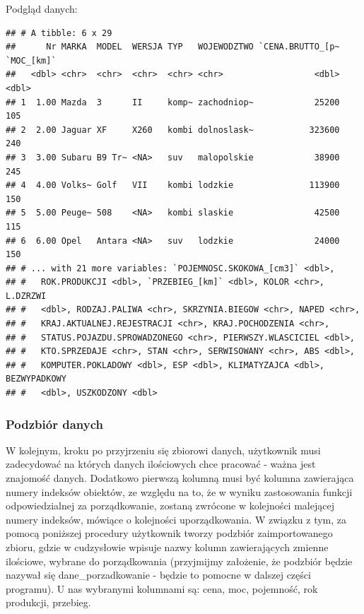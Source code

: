 \documentclass[12pt,a4paper]{report}
\begin{document}
{Podgląd danych:

\begin{Shaded}
\begin{Highlighting}[]
\end{Highlighting}
\end{Shaded}

\begin{verbatim}
## # A tibble: 6 x 29
##      Nr MARKA  MODEL  WERSJA TYP   WOJEWODZTWO `CENA.BRUTTO_[p~ `MOC_[km]`
##   <dbl> <chr>  <chr>  <chr>  <chr> <chr>                  <dbl>      <dbl>
## 1  1.00 Mazda  3      II     komp~ zachodniop~            25200        105
## 2  2.00 Jaguar XF     X260   kombi dolnoslask~           323600        240
## 3  3.00 Subaru B9 Tr~ <NA>   suv   malopolskie            38900        245
## 4  4.00 Volks~ Golf   VII    kombi lodzkie               113900        150
## 5  5.00 Peuge~ 508    <NA>   kombi slaskie                42500        115
## 6  6.00 Opel   Antara <NA>   suv   lodzkie                24000        150
## # ... with 21 more variables: `POJEMNOSC.SKOKOWA_[cm3]` <dbl>,
## #   ROK.PRODUKCJI <dbl>, `PRZEBIEG_[km]` <dbl>, KOLOR <chr>, L.DZRZWI
## #   <dbl>, RODZAJ.PALIWA <chr>, SKRZYNIA.BIEGOW <chr>, NAPED <chr>,
## #   KRAJ.AKTUALNEJ.REJESTRACJI <chr>, KRAJ.POCHODZENIA <chr>,
## #   STATUS.POJAZDU.SPROWADZONEGO <chr>, PIERWSZY.WLASCICIEL <dbl>,
## #   KTO.SPRZEDAJE <chr>, STAN <chr>, SERWISOWANY <chr>, ABS <dbl>,
## #   KOMPUTER.POKLADOWY <dbl>, ESP <dbl>, KLIMATYZAJCA <dbl>, BEZWYPADKOWY
## #   <dbl>, USZKODZONY <dbl>
\end{verbatim}

\subsubsection{Podzbiór danych}\label{podzbior-danych}

W kolejnym, kroku po przyjrzeniu się zbiorowi danych, użytkownik musi
zadecydować na których danych ilościowych chce pracować - ważna jest
znajomość danych. Dodatkowo pierwszą kolumną musi być kolumna
zawierająca numery indeksów obiektów, ze względu na to, że w wyniku
zastosowania funkcji odpowiedzialnej za porządkowanie, zostaną zwrócone
w kolejności malejącej numery indeksów, mówiące o kolejności
uporządkowania. W związku z tym, za pomocą poniższej procedury
użytkownik tworzy podzbiór zaimportowanego zbioru, gdzie w cudzysłowie
wpisuje nazwy kolumn zawierających zmienne ilościowe, wybrane do
porządkowania (przyjmijmy założenie, że podzbiór będzie nazywał się
dane\_porzadkowanie - będzie to pomocne w dalszej części programu). U
nas wybranymi kolumnami są: cena, moc, pojemność, rok produkcji,
przebieg.

}
\end{document}
